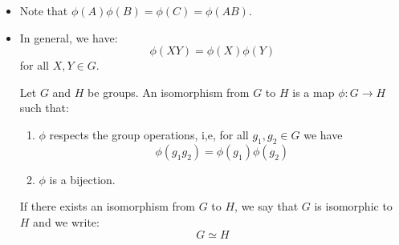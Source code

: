 \begin{itemize}
\begin{center}
\begin{tabular}{c|cccc}
            \cline{2-5}
                                            & \multicolumn{1}{c|}{$\phi(I)$} & \multicolumn{1}{c|}{$\phi(A)$} & \multicolumn{1}{c|}{$\phi(B)$} & \multicolumn{1}{c|}{$\phi(C)$} \\ \hline
            \multicolumn{1}{|c|}{$\phi(I)$} &                                &                                &                                &                                \\ \cline{1-1}
            \multicolumn{1}{|c|}{$\phi(A)$} &                                &                                & $\phi(C)$                      &                                \\ \cline{1-1}
            \multicolumn{1}{|c|}{$\phi(B)$} &                                &                                &                                &                                \\ \cline{1-1}
            \multicolumn{1}{|c|}{$\phi(C)$} &                                &                                &                                &                                \\ \cline{1-1}
            \end{tabular}
    \end{center}
    where we have only written down one entry. 
    \item Note that $\phi(A)\phi(B)=\phi(C)=\phi(AB)$.
    \item In general, we have:
    \begin{equation}
        \phi(XY) = \phi(X)\phi(Y)
    \end{equation}
    for all $X,Y \in G$.
    \begin{definition}
        Let $G$ and $H$ be groups. An isomorphism from $G$ to $H$ is a map $\phi:G \to H$ such that:
        \begin{enumerate}
            \item $\phi$ respects the group operations, i,e, for all $g_1,g_2 \in G$ we have
            \begin{equation}
                \phi(g_1g_2)=\phi(g_1)\phi(g_2)
            \end{equation}
            \item $\phi$ is a bijection.
        \end{enumerate}
        If there exists an isomorphism from $G$ to $H$, we say that $G$ is isomorphic to $H$ and we write:
        \begin{equation}
            G \simeq H
        \end{equation}

\end{definition}
\end{itemize}
